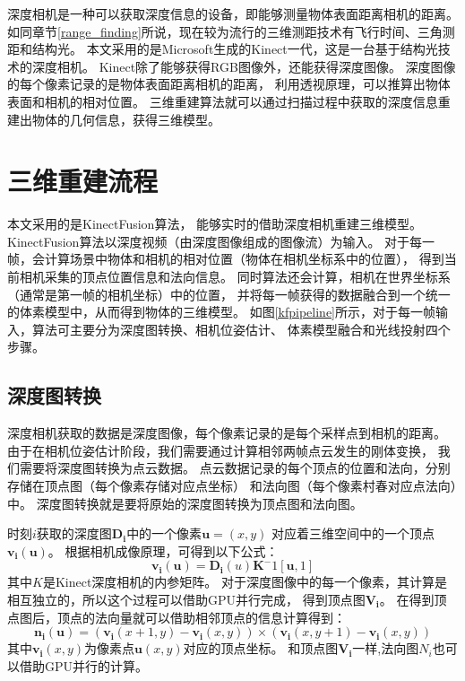 深度相机是一种可以获取深度信息的设备，即能够测量物体表面距离相机的距离。
如同章节\ref{range_finding}所说，现在较为流行的三维测距技术有飞行时间、三角测距和结构光。
本文采用的是Microsoft生成的Kinect一代，这是一台基于结构光技术的深度相机。
Kinect除了能够获得RGB图像外，还能获得深度图像。
深度图像的每个像素记录的是物体表面距离相机的距离，
利用透视原理，可以推算出物体表面和相机的相对位置。
三维重建算法就可以通过扫描过程中获取的深度信息重建出物体的几何信息，获得三维模型。

\section{三维重建流程}
本文采用的是KinectFusion算法\cite{izadi2011kinectfusion}，
能够实时的借助深度相机重建三维模型。
KinectFusion算法\cite{izadi2011kinectfusion}以深度视频（由深度图像组成的图像流）为输入。
对于每一帧，会计算场景中物体和相机的相对位置（物体在相机坐标系中的位置），
得到当前相机采集的顶点位置信息和法向信息。
同时算法还会计算，相机在世界坐标系（通常是第一帧的相机坐标）中的位置，
并将每一帧获得的数据融合到一个统一的体素模型中，从而得到物体的三维模型。
如图\ref{kfpipeline}所示，对于每一帧输入，算法可主要分为深度图转换、相机位姿估计、
体素模型融合和光线投射四个步骤。

\subsection{深度图转换}
深度相机获取的数据是深度图像，每个像素记录的是每个采样点到相机的距离。
由于在相机位姿估计阶段，我们需要通过计算相邻两帧点云发生的刚体变换，
我们需要将深度图转换为点云数据。
点云数据记录的每个顶点的位置和法向，分别存储在顶点图（每个像素存储对应点坐标）
和法向图（每个像素村春对应点法向）中。
深度图转换就是要将原始的深度图转换为顶点图和法向图。

时刻$i$获取的深度图$\bm{D_i}$中的一个像素$\bm{u}=(x,y)$
对应着三维空间中的一个顶点$\bm{v_i}(\bm{u})$。
根据相机成像原理，可得到以下公式：
\begin{equation}
    \bm{v_i(u)}=\bm{D_i}(u)\bm{K}^-1[\bm{u},1]
\end{equation}
其中$K$是Kinect深度相机的内参矩阵。
对于深度图像中的每一个像素，其计算是相互独立的，所以这个过程可以借助GPU并行完成，
得到顶点图$\bm{V_i}$。
在得到顶点图后，顶点的法向量就可以借助相邻顶点的信息计算得到：
\begin{equation}
    \bm{n_i}(\bm{u})=(\bm{v_i}(x+1,y)-\bm{v_i}(x,y))\times(\bm{v_i}(x,y+1)-\bm{v_i}(x,y))
\end{equation}
其中$\bm{v_i}(x,y)$为像素点$\bm{u}(x,y)$对应的顶点坐标。
和顶点图$\bm{V_i}$一样,法向图$N_i$也可以借助GPU并行的计算。

